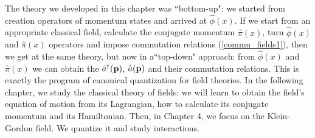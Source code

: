 The theory we developed in this chapter was ``bottom-up": we started from creation operators of momentum states and arrived at $\hat{\phi}(x)$. If we start from an appropriate classical field, calculate the conjugate momentum $\hat{\pi}(x)$, turn $\hat{\phi}(x)$ and $\hat{\pi}(x)$  operators and impose commutation relations (\ref{commu_fields1}), then we  get at the same theory, but now in a``top-down" approach: from $\hat{\phi}(x)$ and $\hat{\pi}(x)$ we can obtain the $\hat{a}^\dagger(\vb{p})$, $\hat{a}(\vb{p})$ and their commutation relations. This is exactly the program of canonical quantization for field theories. In the following chapter, we study the classical theory of fields: we will learn to obtain the field's equation of motion from its Lagrangian, how to calculate its conjugate momentum and its Hamiltonian. Then, in Chapter 4, we focus on the Klein-Gordon field. We quantize it and study interactions.